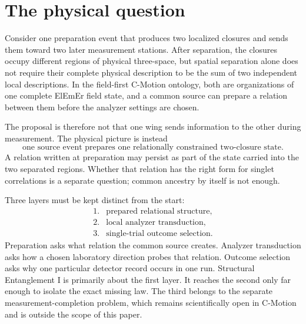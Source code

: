 \documentclass[11pt]{article}
\theoremstyle{remark}
\newcommand{\cmotion}{\mbox{C-Motion}}
\newcommand{\ElEmEr}{\mbox{ElEmEr}}
\begin{document}
\section{The physical question}
\label{sec:physical_question}

Consider one preparation event that produces two localized closures and sends them toward two later
measurement stations.  After separation, the closures occupy different regions of physical
three-space, but spatial separation alone does not require their complete physical description to be
the sum of two independent local descriptions.  In the field-first \cmotion{} ontology, both are
organizations of one complete \ElEmEr{} field state, and a common source can prepare a relation
between them before the analyzer settings are chosen.

The proposal is therefore not that one wing sends information to the other during measurement.  The
physical picture is instead
\begin{equation}
  \boxed{\text{one source event prepares one relationally constrained two-closure state}.}
  \label{eq:common_source_picture}
\end{equation}
A relation written at preparation may persist as part of the state carried into the two separated
regions.  Whether that relation has the right form for singlet correlations is a separate question;
common ancestry by itself is not enough.

Three layers must be kept distinct from the start:
\begin{equation}
\boxed{
\begin{array}{ll}
1.&\text{prepared relational structure},\\
2.&\text{local analyzer transduction},\\
3.&\text{single-trial outcome selection}.
\end{array}}
\label{eq:three_layers}
\end{equation}
Preparation asks what relation the common source creates.  Analyzer transduction asks how a chosen
laboratory direction probes that relation.  Outcome selection asks why one particular detector
record occurs in one run.  Structural Entanglement I is primarily about the first layer.  It reaches
the second only far enough to isolate the exact missing law.  The third belongs to the separate measurement-completion problem, which remains scientifically open in \cmotion{} and is outside the scope of this paper.
\end{document}
